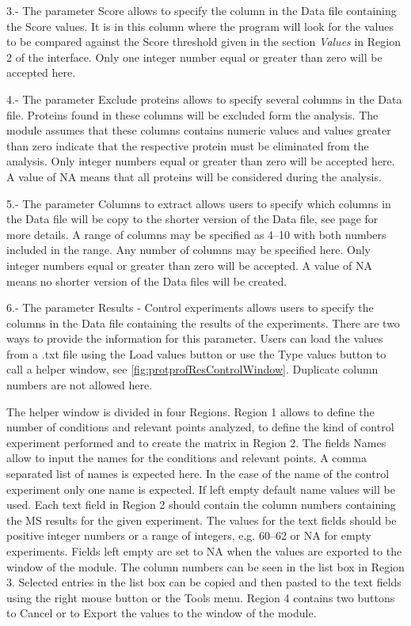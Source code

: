 \num{3}.- The parameter Score allows to specify the column in the Data file containing the Score values.  It is in this column where the program will look for the values to be compared against the Score threshold given in the section \textit{Values} in Region \num{2} of the interface. Only one integer number equal or greater than zero will be accepted here. 

\num{4}.- The parameter Exclude proteins allows to specify several columns in the Data file. Proteins found in these columns will be excluded form the analysis. The module assumes that these columns contains numeric values and values greater than zero indicate that the respective protein must be eliminated from the analysis. Only integer numbers equal or greater than zero will be accepted here. A value of NA means that all proteins will be considered during the analysis. 

\num{5}.- The parameter Columns to extract\label{par:protprofColumnExtract} allows users to specify which columns in the Data file will be copy to the shorter version of the Data file, see page \pageref{subsec:utilShortDF} for more details. A range of columns may be specified as \numrange[range-phrase = --]{4}{10} with both numbers included in the range. Any number of columns may be specified here. Only integer numbers equal or greater than zero will be accepted. A value of NA means no shorter version of the Data files will be created.

\num{6}.-  \label{par:protprofResultControl}The parameter Results - Control experiments allows users to specify the columns in the Data file containing the results of the experiments. There are two ways to provide the information for this parameter. Users can load the values from a .txt file using the Load values button or use the Type values button to call a helper window, see \autoref{fig:protprofResControlWindow}. Duplicate column numbers are not allowed here.

The helper window is divided in four Regions. Region \num{1} allows to define the number of conditions and relevant points analyzed, to define the kind of control experiment performed and to create the matrix in Region \num{2}. The fields Names allow to input the names for the conditions and relevant points. A comma separated list of names is expected here. In the case of the name of the control experiment only one name is expected. If left empty default name values will be used. Each text field in Region \num{2} should contain the column numbers containing the MS results for the given experiment. The values for the text fields should be positive integer numbers or a range of integers, e.g. \numrange[range-phrase=--]{60}{62} or NA for empty experiments. Fields left empty are set to NA when the values are exported to the window of the module. The column numbers can be seen in the list box in Region \num{3}. Selected entries in the list box can be copied and then pasted to the text fields using the right mouse button or the Tools menu. Region \num{4} contains two buttons to Cancel or to Export the values to the window of the module.  

